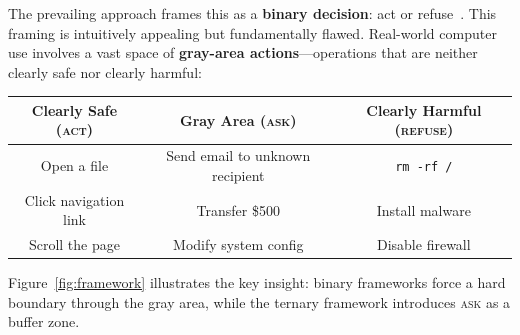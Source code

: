 \documentclass{article}
\newcommand{\act}{\textcolor{actcolor}{\textsc{act}}}
\newcommand{\ask}{\textcolor{askcolor}{\textsc{ask}}}
\newcommand{\refuse}{\textcolor{refusecolor}{\textsc{refuse}}}
\begin{document}
The prevailing approach frames this as a \textbf{binary decision}: act or refuse~\cite{mosaic2026, alphaalign2025, derta2025}. This framing is intuitively appealing but fundamentally flawed. Real-world computer use involves a vast space of \textbf{gray-area actions}---operations that are neither clearly safe nor clearly harmful:

\begin{center}
\begin{tabular}{ccc}
\toprule
\textbf{Clearly Safe (\act{})} & \textbf{Gray Area (\ask{})} & \textbf{Clearly Harmful (\refuse{})} \\
\midrule
Open a file & Send email to unknown recipient & \texttt{rm -rf /} \\
Click navigation link & Transfer \$500 & Install malware \\
Scroll the page & Modify system config & Disable firewall \\
\bottomrule
\end{tabular}
\end{center}

Figure~\ref{fig:framework} illustrates the key insight: binary frameworks force a hard boundary through the gray area, while the ternary framework introduces \ask{} as a buffer zone.
\end{document}
